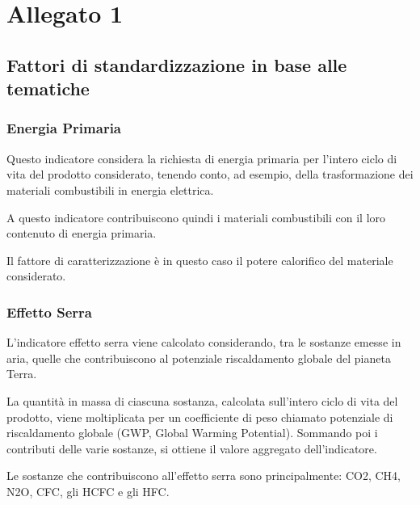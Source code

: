 \section*{Allegato 1}
\subsection*{Fattori di standardizzazione in base alle tematiche}
\subsubsection*{Energia Primaria}






Questo indicatore considera la richiesta di energia primaria per l'intero ciclo di vita del prodotto considerato, tenendo conto, ad esempio, della trasformazione dei materiali combustibili in energia elettrica.

A questo indicatore contribuiscono quindi i materiali combustibili con il loro contenuto di energia primaria.

Il fattore di caratterizzazione è in questo caso il potere calorifico del materiale considerato.
\subsubsection*{Effetto Serra}
L'indicatore effetto serra viene calcolato considerando, tra le sostanze emesse in aria, quelle che contribuiscono al potenziale riscaldamento globale del pianeta Terra.

La quantità in massa di ciascuna sostanza, calcolata sull'intero ciclo di vita del prodotto, viene moltiplicata per un coefficiente di peso chiamato potenziale di riscaldamento globale (GWP, Global Warming Potential). Sommando poi i contributi delle varie sostanze, si ottiene il valore aggregato dell'indicatore.

Le sostanze che contribuiscono all'effetto serra sono principalmente: CO2, CH4, N2O, CFC, gli HCFC e gli HFC.

